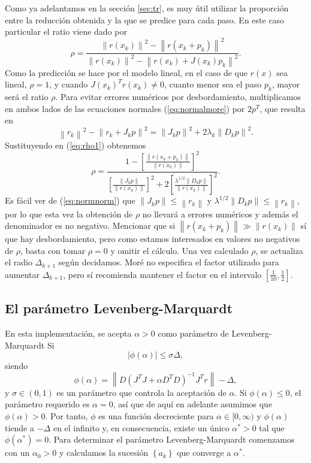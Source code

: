\documentclass[11pt,a4paper]{book}
\theoremstyle{definition}
\theoremstyle{remark}
\newcommand{\norm}[1]{\left\lVert#1\right\rVert}
\newcommand{\sucesion}[1]{\left\{#1\right\}}
\begin{document}
Como ya adelantamos en la sección \ref{sec:tr}, es muy útil utilizar la proporción entre la
reducción obtenida y la que se predice para cada paso. En este caso particular el ratio viene
dado por
\begin{equation}\label{eq:rho1}
	\rho = \frac{\norm{r(x_k)}^2-\norm{r(x_k+p_k)}^2}{\norm{r(x_k)}^2-\norm{r(x_k)+J(x_k)p_k}^2}.
\end{equation}
Como la predicción se hace por el modelo lineal, en el caso de que $r(x)$ sea lineal, $\rho=1$,
y cuando $J(x_k)^Tr(x_k) \neq 0$, cuanto menor sea el paso $p_k$, mayor será el ratio $\rho$. Para
evitar errores numéricos por desbordamiento, multiplicamos en ambos lados de las ecuaciones normales (\ref{eq:normalmore})
por $2p^T$, que resulta en
\begin{equation}\label{eq:normnorm}
	\norm{r_k}^2 - \norm{r_k + J_kp}^2 = \norm{J_kp}^2 + 2\lambda_k\norm{D_kp}^2.
\end{equation}
Sustituyendo en (\ref{eq:rho1}) obtenemos
\begin{equation}
	\rho = \frac{1-\left[\frac{\norm{r(x_k+p_k)}}{\norm{r(x_k)}}\right]^2}
				{\left[\frac{\norm{J_kp}}{\norm{r(x_k)}}\right]^2
				+ 2\left[\frac{\lambda^{1/2}\norm{D_kp}}{\norm{r(x_k)}}\right]^2}.
\end{equation}
Es fácil ver de (\ref{eq:normnorm}) que $\norm{J_kp} \leq \norm{r_k}$ y $\lambda^{1/2}\norm{D_kp} \leq \norm{r_k}$,
por lo que esta vez la obtención de $\rho$ no llevará a errores numéricos y además el denominador es
no negativo. Mencionar que si $\norm{r(x_k+p_k)} \gg \norm{r(x_k)}$ sí que hay desbordamiento, pero
como estamos interesados en valores no negativos de $\rho$, basta con tomar $\rho=0$ y omitir el cálculo.
Una vez calculado $\rho$, se actualiza el radio $\Delta_{k+1}$ según decidamos. Moré no especifica
el factor utilizado para aumentar $\Delta_{k+1}$, pero sí recomienda mantener el factor en el intervalo
$[\frac{1}{10}, \frac{1}{2}]$.

\subsection{El parámetro Levenberg-Marquardt}
En esta implementación, se acepta $\alpha>0$ como parámetro de Levenberg-Marquardt Si
\begin{equation}\label{eq:phi}
	|\phi(\alpha)| \leq \sigma\Delta,
\end{equation}
siendo
\begin{equation}
	\phi(\alpha) = \norm{D(J^TJ+\alpha D^TD)^{-1}J^Tr}-\Delta,
\end{equation}
y $\sigma \in (0,1)$ es un parámetro que controla la aceptación de $\alpha$. Si $\phi(\alpha) \leq 0$,
el parámetro requerido es $\alpha=0$, así que de aquí en adelante asumimos que $\phi(\alpha) > 0$. Por
tanto, $\phi$ es una función decreciente para $\alpha \in [0, \infty)$ y $\phi(\alpha)$ tiende a
$-\Delta$ en el infinito y, en consecuencia, existe un único $\alpha^*>0$ tal que $\phi(\alpha^*)=0$.
Para determinar el parámetro Levenberg-Marquardt comenzamos con un $\alpha_0>0$ y calculamos la
sucesión $\sucesion{a_k}$ que converge a $\alpha^*$.
\end{document}
